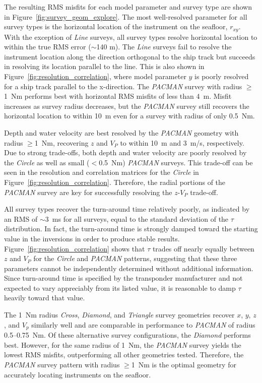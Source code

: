The resulting RMS misfits for each model parameter and survey type are shown in Figure~\ref{fig:survey_geom_explore}. The most well-resolved parameter for all survey types is the horizontal location of the instrument on the seafloor, $r_{xy}$. With the exception of \textit{Line} surveys, all survey types resolve horizontal location to within the true RMS error ($\sim$140 m). The \textit{Line} surveys fail to resolve the instrument location along the direction orthogonal to the ship track but succeeds in resolving its location parallel to the line. This is also shown in Figure~\ref{fig:resolution_correlation}, where model parameter $y$ is poorly resolved for a ship track parallel to the x-direction. The \textit{PACMAN} survey with radius $\geq$1~Nm performs best with horizontal RMS misfits of less than 4~m. Misfit increases as survey radius decreases, but the \textit{PACMAN} survey still recovers the horizontal location to within 10~m even for a survey with radius of only 0.5~Nm.

Depth and water velocity are best resolved by the \textit{PACMAN} geometry with radius $\geq$1~Nm, recovering $z$ and $V_{P}$ to within 10~m and 3~m/s, respectively. Due to strong trade-offs, both depth and water velocity are poorly resolved by the \textit{Circle} as well as small ($<$0.5~Nm) \textit{PACMAN} surveys. This trade-off can be seen in the resolution and correlation matrices for the \textit{Circle} in Figure~\ref{fig:resolution_correlation}. Therefore, the radial portions of the \textit{PACMAN} survey are key for successfully resolving the $z$-$V_P$ trade-off.

All survey types recover the turn-around time relatively poorly, as indicated by an RMS of $\sim$3~ms for all surveys, equal to the standard deviation of the $\tau$ distribution. In fact, the turn-around time is strongly damped toward the starting value in the inversions in order to produce stable results. Figure~\ref{fig:resolution_correlation} shows that $\tau$ trades off nearly equally between $z$ and $V_{P}$ for the \textit{Circle} and \textit{PACMAN} patterns, suggesting that these three parameters cannot be independently determined without additional information. Since turn-around time is specified by the transponder manufacturer and not expected to vary appreciably from its listed value, it is reasonable to damp $\tau$ heavily toward that value.

The 1~Nm radius \textit{Cross}, \textit{Diamond}, and \textit{Triangle} survey geometries recover $x$, $y$, $z$, and $V_{p}$ similarly well and are comparable in performance to \textit{PACMAN} of radius 0.5--0.75~Nm. Of these alternative survey configurations, the \textit{Diamond} performs best. However, for the same radius of 1~Nm, the \textit{PACMAN} survey yields the lowest RMS misfits, outperforming all other geometries tested. Therefore, the \textit{PACMAN} survey pattern with radius $\geq$1~Nm is the optimal geometry for accurately locating instruments on the seafloor.

